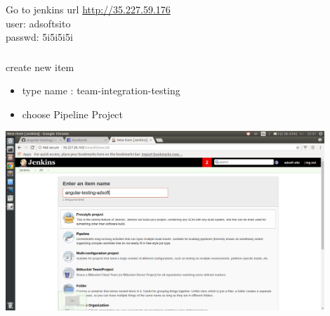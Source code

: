 \documentclass{beamer}
\begin{document}
\begin{frame}\frametitle{} 

\begin{block}{Go to jenkins url}
\url{http://35.227.59.176} \\
user:  adsoftsito \\
passwd:  5i5i5i5i

\end{block}

\end{frame}


\begin{frame}\frametitle{} 

\begin{block}{create new item}
\begin{itemize}
\item type name :  team-integration-testing 
\item choose Pipeline Project
\end{itemize}
\end{block}

\begin{center}
\includegraphics[width=0.9\textwidth]{jenkins-newitem.png}
\end{center}

\end{frame}
\end{document}
